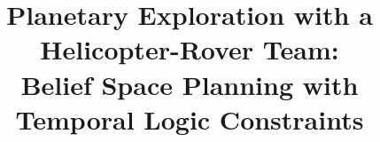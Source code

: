 \documentclass[conference]{IEEEtran}
\begin{document}

\title{\huge Planetary Exploration with a Helicopter-Rover Team:\\
Belief Space Planning with Temporal Logic Constraints}






% 

\maketitle
\end{document}
